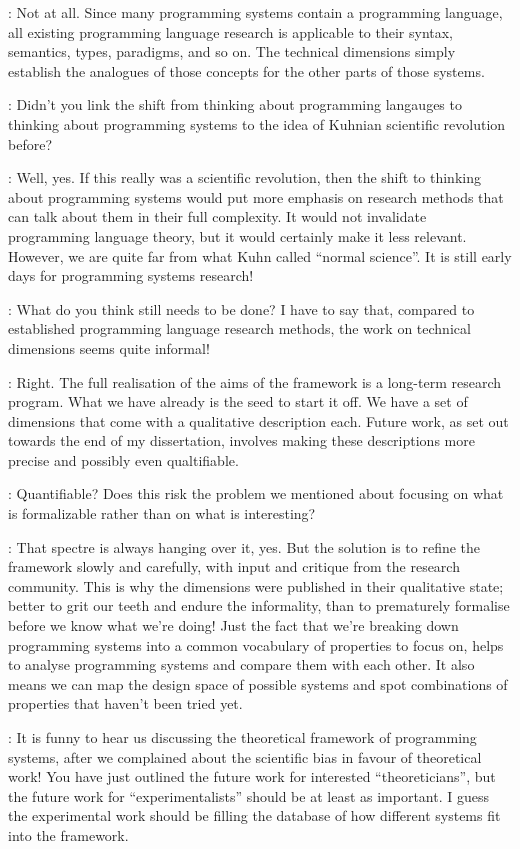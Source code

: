 \documentclass[runningheads]{llncs}
\newcommand{\T}{Tomas}
\newcommand{\J}{Joel}
\newcommand{\says}[2][gg]{\vspace{0.5em}\noindent\hangindent=0.5cm{\textsc{#1}}: #2}
\begin{document}
\says[\J]{Not at all. Since many programming systems contain a programming language, all existing programming language research is applicable to their syntax, semantics, types, paradigms, and so on. The technical dimensions simply establish the analogues of those concepts for the other parts of those systems.}

\says[\T]{Didn't you link the shift from thinking about programming langauges to thinking about programming systems to the idea of Kuhnian scientific revolution before?}

\says[\J]{Well, yes. If this really was a scientific revolution, then the shift to thinking about programming systems would put more emphasis on research methods that can talk about them in their full complexity. It would not invalidate programming language theory, but it would certainly make it less relevant. However, we are quite far from what Kuhn called ``normal science''. It is still early days for programming systems research!}

\says[\T]{What do you think still needs to be done? I have to say that, compared to established programming language research methods, the work on technical dimensions seems quite informal!}

\says[\J]{Right. The full realisation of the aims of the framework is a long-term research program. What we have already is the seed to start it off. We have a set of dimensions that come with a qualitative description each. Future work, as set out towards the end of my dissertation, involves making these descriptions more precise and possibly even qualtifiable.}

\says[\T]{Quantifiable? Does this risk the problem we mentioned about focusing on what is formalizable rather than on what is interesting?}

\says[\J]{That spectre is always hanging over it, yes. But the solution is to refine the framework slowly and carefully, with input and critique from the research community. This is why the dimensions were published in their qualitative state; better to grit our teeth and endure the informality, than to prematurely formalise before we know what we're doing! Just the fact that we're breaking down programming systems into a common vocabulary of properties to focus on, helps to analyse programming systems and compare them with each other. It also means we can map the design space of possible systems and spot combinations of properties that haven't been tried yet.}

\says[\T]{It is funny to hear us discussing the theoretical framework of programming systems, after we complained about the scientific bias in favour of theoretical work! You have just outlined the future work for interested ``theoreticians'', but the future work for ``experimentalists'' should be at least as important. I guess the experimental work should be filling the database of how different systems fit into the framework.}
\end{document}
